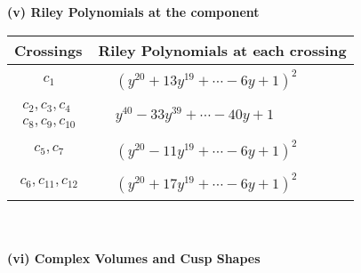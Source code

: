 \documentclass[1p]{elsarticle_modified}
\theoremstyle{definition}
\begin{document}
\newpage\renewcommand{\arraystretch}{1}
\flushleft \textbf{(v) Riley Polynomials at the component}\newline \\
\begin{tabular}{m{50pt}|m{274pt}}
Crossings & \hspace{64pt}Riley Polynomials at each crossing \\
\hline $$\begin{aligned}c_{1}\end{aligned}$$&$\begin{aligned}
&(y^{20}+13 y^{19}+\cdots-6 y+1)^{2}
\end{aligned}$\\
\hline $$\begin{aligned}c_{2},c_{3},c_{4}\\c_{8},c_{9},c_{10}\end{aligned}$$&$\begin{aligned}
&y^{40}-33 y^{39}+\cdots-40 y+1
\end{aligned}$\\
\hline $$\begin{aligned}c_{5},c_{7}\end{aligned}$$&$\begin{aligned}
&(y^{20}-11 y^{19}+\cdots-6 y+1)^{2}
\end{aligned}$\\
\hline $$\begin{aligned}c_{6},c_{11},c_{12}\end{aligned}$$&$\begin{aligned}
&(y^{20}+17 y^{19}+\cdots-6 y+1)^{2}
\end{aligned}$\\
\hline
\end{tabular}\\~\\
\newpage\flushleft \textbf{(vi) Complex Volumes and Cusp Shapes}
\end{document}
